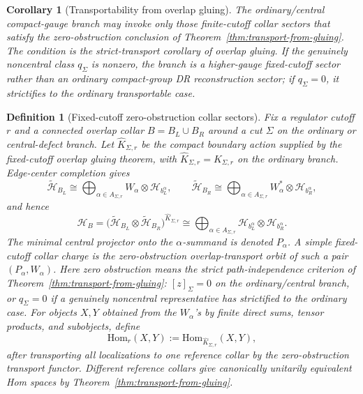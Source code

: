 \documentclass[11pt]{article}
\newtheorem{corollary}[theorem]{Corollary}
\newtheorem{definition}[theorem]{Definition}
\begin{document}
\begin{corollary}[Transportability from overlap gluing]\label{cor:transportability-from-overlap-gluing}
The ordinary/central compact-gauge branch may invoke only those finite-cutoff collar sectors that
satisfy the zero-obstruction conclusion of Theorem~\ref{thm:transport-from-gluing}. The condition
is the strict-transport corollary of overlap gluing. If the genuinely
noncentral class \(q_\Sigma\) is nonzero, the branch is a higher-gauge fixed-cutoff sector rather
than an ordinary compact-group DR reconstruction sector; if \(q_\Sigma=0\), it strictifies to the
ordinary transportable case.
\end{corollary}

\begin{definition}[Fixed-cutoff zero-obstruction collar sectors]\label{def:fixed-cutoff-collar-sectors}
Fix a regulator cutoff \(r\) and a connected overlap collar \(B=B_L\cup B_R\) around a cut
\(\Sigma\) on the ordinary or central-defect branch. Let \(\widehat K_{\Sigma,r}\) be the compact
boundary action supplied by the fixed-cutoff overlap gluing theorem, with
\(\widehat K_{\Sigma,r}=K_{\Sigma,r}\) on the ordinary branch. Edge-center completion gives
\[
\widetilde{\mathcal H}_{B_L}
\cong
\bigoplus_{\alpha\in A_{\Sigma,r}}
W_\alpha\otimes \mathcal H_{b_L^\alpha},
\qquad
\widetilde{\mathcal H}_{B_R}
\cong
\bigoplus_{\alpha\in A_{\Sigma,r}}
W_\alpha^*\otimes \mathcal H_{b_R^\alpha},
\]
and hence
\[
\mathcal H_B
=
\bigl(\widetilde{\mathcal H}_{B_L}\otimes\widetilde{\mathcal H}_{B_R}\bigr)^{\widehat K_{\Sigma,r}}
\cong
\bigoplus_{\alpha\in A_{\Sigma,r}}
\mathcal H_{b_L^\alpha}\otimes \mathcal H_{b_R^\alpha}.
\]
The minimal central projector onto the \(\alpha\)-summand is denoted \(P_\alpha\). A simple
fixed-cutoff collar charge is the zero-obstruction overlap-transport orbit of such a pair
\((P_\alpha,W_\alpha)\). Here zero obstruction means the strict path-independence criterion of
Theorem~\ref{thm:transport-from-gluing}: \([z]_\Sigma=0\) on the ordinary/central branch, or
\(q_\Sigma=0\) if a genuinely noncentral representative has strictified to the ordinary case.
For objects \(X,Y\) obtained from the \(W_\alpha\)'s by finite direct sums, tensor products, and
subobjects, define
\[
\mathrm{Hom}_r(X,Y):=\mathrm{Hom}_{\widehat K_{\Sigma,r}}(X,Y),
\]
after transporting all localizations to one reference collar by the zero-obstruction transport
functor. Different reference collars give canonically unitarily equivalent Hom spaces by
Theorem~\ref{thm:transport-from-gluing}.
\end{definition}
\end{document}
